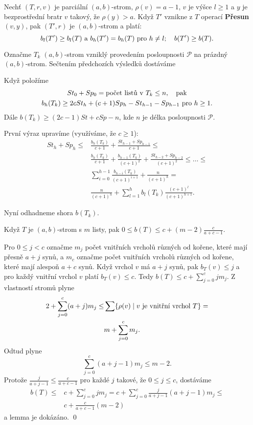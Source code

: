\documentclass[a4paper,12pt]{article}
\begin{document}
\begin{lemma_counting} Nechť $(T,r,v)$ je parciální $(a,b)$-strom, 
$\rho (v)=a-1$, $v$ je výšce $l\ge 1$ a $y$ je bezprostřední bratr $v$ takový, že $\rho(y)>a$. 
Když $T'$ vznikne z $T$ operací {\bf Přesun$(v,y)$}, 
pak $(T',r)$ je $(a,b)$-strom a platí:  
$$b_l(T')\ge b_l(T)\text{\rm\ a }b_h(T')=b_h(T)\text{\rm\ pro }h\ne 
l;\quad b(T')\ge b(T).$$
\end{lemma_counting}

Označme $T_k$ $(a,b)$-strom vzniklý provedením posloupnosti 
$\mathcal P$ na prázdný $(a,b)$-strom. Sečtením předchozích 
výsledků dostá\-váme

\begin{dusledek_counting}Když položíme 
\begin{gather*} St_0+Sp_0=\text{\rm počet listů v }T_k\le n
,\quad\text{\rm pak}\\
b_h(T_k)\ge 2cSt_h+(c+1)Sp_h-St_{h-1}-Sp_{h-1}\text{\rm\ pro }h\ge 
1.\end{gather*}
Dále $b(T_k)\ge (2c-1)St+cSp-n$, kde $n$ je délka posloupnosti $
\mathcal P$.
\end{dusledek_counting}

První výraz upravíme (využíváme, že $
c\ge 1$):
\begin{align*} St_h+Sp_h\le&\frac {b_h(T_k)}{c+1}+\frac {St_{h-1}+Sp_{h
-1}}{c+1}\le\\
&\frac {b_h(T_k)}{c+1}+\frac {b_{h-1}(T_k)}{(c+1)^2}+\frac {St_{h
-2}+Sp_{h-2}}{(c+1)^2}\le\dots\le\\
&\sum_{i=0}^{h-1}\frac {b_{h-i}(T_k)}{(c+1)^{i+1}}+\frac n{(c+1)^
h}=\\
&\frac n{(c+1)^h}+\sum_{l=1}^hb_l(T_k)\frac {(c+1)^l}{(c+1)^{h+1}}
.\end{align*}

Nyní odhadneme shora $b(T_k)$.

\begin{lemma_counting}Když $T$ je $(a,b)$-strom s $m$ listy, pak 
$0\le b(T)\le c+(m-2)\frac c{a+c-1}$.
\end{lemma_counting}

Pro $0\le j<c$ označme $m_j$ počet 
vnitřních vrcholů různých od kořene, 
které mají přesně $a+j$ synů, a $m_c$ označme 
počet vnitřních vrcholů různých od 
kořene, které mají alespoň $a+c$ synů. Když 
vrchol $v$ má $a+j$ synů, pak $b_T(v)\le j$ a pro 
každý vnitřní vrchol $v$ platí $b_T(v)\le c$. Tedy 
$b(T)\le c+\sum_{j=0}^cjm_j$. Z vlastností stromů plyne 
\begin{align*}2+\sum_{j=0}^c(a+j)m_j\le&\sum \{\rho (v)\mid v\text{\rm\ je vnitřní vrchol }
T\}=\\
&m+\sum_{j=0}^cm_j.\end{align*}
Odtud plyne
$$\sum_{j=0}^c(a+j-1)m_j\le m-2.$$
Protože $\frac j{a+j-1}\le\frac c{a+c-1}$ pro každé $j$ takové, že $
0\le j\le c$, 
dostáváme
\begin{align*} b(T)\le&c+\sum_{j=0}^cjm_j=c+\sum_{j=0}^c\frac j{a+j-1}(
a+j-1)m_j\le\\
&c+\frac c{a+c-1}(m-2)\end{align*}
a lemma je dokázáno. \qed
\enddemo
\end{document}
